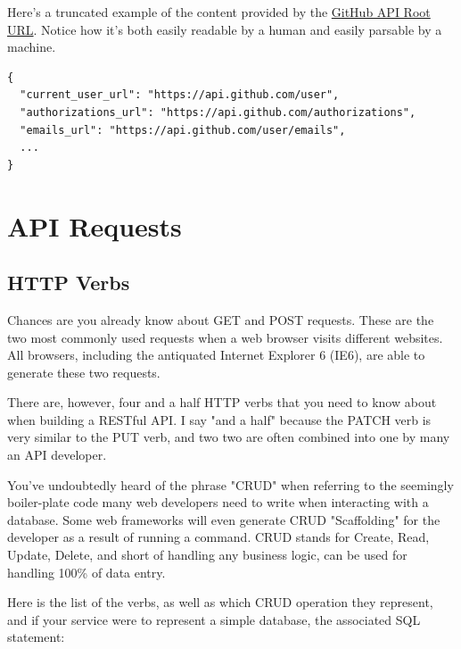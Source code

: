 \documentclass{book}
\begin{document}
Here's a truncated example of the content provided by the \href{https://api.github.com/}{GitHub API Root URL}. Notice how it's both easily readable by a human and easily parsable by a machine.

\begin{verbatim}
{
  "current_user_url": "https://api.github.com/user",
  "authorizations_url": "https://api.github.com/authorizations",
  "emails_url": "https://api.github.com/user/emails",
  ...
}
\end{verbatim}


\chapter{API Requests}

\section{HTTP Verbs}

Chances are you already know about GET and POST requests. These are the two most commonly used requests when a web browser visits different websites. All browsers, including the antiquated Internet Explorer 6 (IE6), are able to generate these two requests.

There are, however, four and a half HTTP verbs that you need to know about when building a RESTful API. I say "and a half" because the PATCH verb is very similar to the PUT verb, and two two are often combined into one by many an API developer.

You've undoubtedly heard of the phrase "CRUD" when referring to the seemingly boiler-plate code many web developers need to write when interacting with a database. Some web frameworks will even generate CRUD "Scaffolding" for the developer as a result of running a command. CRUD stands for Create, Read, Update, Delete, and short of handling any business logic, can be used for handling 100\% of data entry.

Here is the list of the verbs, as well as which CRUD operation they represent, and if your service were to represent a simple database, the associated SQL statement:
\end{document}
